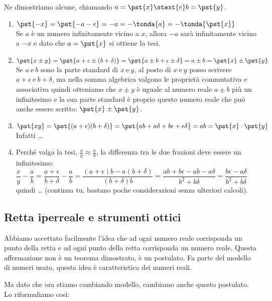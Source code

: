 Ne dimostriamo alcune, chiamando \quad  \(a=\pst{x} \stext{ e } b=\pst{y}\).
\begin{enumerate}%
 \item \(\pst{-x}=\pst{-a -\epsilon}=-a=-\tonda{a}=-\tonda{\pst{x}}\)\\
Se \(a\) è un numero infinitamente vicino a \(x\), allora \(-a\) sarà 
infinitamente vicino a \(-x\) e dato che \(a=\pst{x}\) si ottiene la tesi.
 \item \(\pst{x \pm y} = \pst{a+\epsilon \pm (b+\delta)}= 
         \pst{a\pm b+\epsilon \pm \delta}= a\pm b = \pst{x}\pm\pst{y}\)\\
Se \(a ~ \text{e} ~ b\) sono la parte standard di \(x ~ \text{e} ~ y\),
al posto di \(x ~ \text{e} ~ y\) posso scrivere 
\(a+\epsilon ~ \text{e} ~ b+\delta\), ma nella somma algebrica valgono le 
proprietà commutativa e associativa quindi otteniamo che \(x \pm y\) è 
uguale al numero reale \(a \pm b\) più un infinitesimo e la sua parte 
standard è proprio questo numero reale che può anche essere scritto:
\(\pst{x}\pm\pst{y}\).
 \item\(\pst{xy} = \pst{(a+\epsilon)(b+\delta)}=
        \pst{ab+a\delta+b\epsilon+\epsilon\delta}=ab=
        \pst{x} \cdot \pst{y}\) \\
Infatti \dots
 \item Perché valga la tesi, \(\frac{x}{y} \approx \frac{a}{b}\), la 
differenza tra le due frazioni deve essere un infinitesimo:\\
\(\dfrac{x}{y}- \dfrac{a}{b}=\dfrac{a+\epsilon}{b+\delta}-\dfrac{a}{b}=
  \dfrac{(a+\epsilon)b-a(b+\delta)}{(b+\delta)b}=
  \dfrac{ab+b\epsilon-ab-a\delta}{b^2+b\delta}=
  \dfrac{b\epsilon-a\delta}{b^2+b\delta}\)\\ quindi \dots
(continua tu, bastano poche considerazioni senza ulteriori calcoli).
\end{enumerate}

\subsection{Retta iperreale e strumenti ottici}
\label{subsec:insnum_retta}

Abbiamo accettato facilmente l'idea che 
ad ogni numero reale corrisponda un punto della retta e ad ogni 
punto della retta corrisponda un numero reale. 
Questa affermazione non è un teorema dimostrato, è un postulato. 
Fa parte del modello di numeri usato, questa idea è caratteristica dei 
numeri reali. 

Ma dato che ora stiamo cambiando modello, cambiamo anche questo postulato. 
Lo riformuliamo così:

